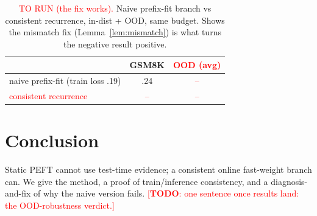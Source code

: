 \documentclass{article}       %
\newcommand{\todo}[1]{\textcolor{red}{[\textbf{TODO}: #1]}}
\begin{document}
\begin{table}[t]\centering
\caption{\textcolor{red}{TO RUN (the fix works).} Naive prefix-fit branch vs consistent recurrence, in-dist + OOD, same
budget. Shows the mismatch fix (Lemma~\ref{lem:mismatch}) is what turns the negative result positive.}
\label{tab:diag}
\begin{tabular}{lcc}
\toprule
 & GSM8K & \textcolor{red}{OOD (avg)}\\
\midrule
naive prefix-fit (train loss .19) & .24 & \textcolor{red}{--}\\
\textcolor{red}{consistent recurrence} & \textcolor{red}{--} & \textcolor{red}{--}\\
\bottomrule
\end{tabular}
\end{table}

\section{Conclusion}
Static PEFT cannot use test-time evidence; a consistent online fast-weight branch can. We give the method, a proof of
train/inference consistency, and a diagnosis-and-fix of why the naive version fails. \todo{one sentence once results land:
the OOD-robustness verdict.}


\end{document}
